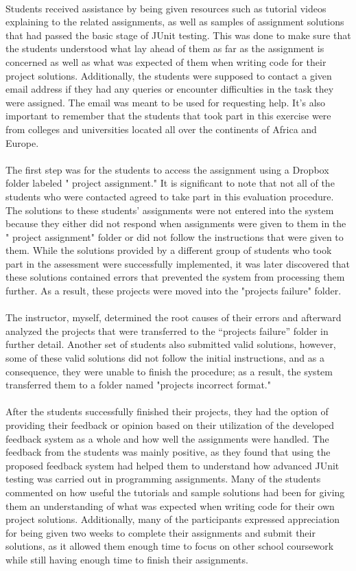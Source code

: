 \\ 
Students received assistance by being given resources such as tutorial videos explaining to the related assignments, as well as samples of assignment solutions that had passed the basic stage of JUnit testing. This was done to make sure that the students understood what lay ahead of them as far as the assignment is concerned as well as what was expected of them when writing code for their project solutions.  Additionally, the students were supposed to contact a given email address if they had any queries or encounter difficulties in the task they were assigned. The email was meant to be used for requesting help. It's also important to remember that the students that took part in this exercise were from colleges and universities located all over the continents of Africa and Europe.\\
\\
The first step was for the students to access the assignment using a Dropbox folder labeled " project assignment." It is significant to note that not all of the students who were contacted agreed to take part in this evaluation procedure. The solutions to these students' assignments were not entered into the system because they either did not respond when assignments were given to them in the " project assignment" folder or did not follow the instructions that were given to them. While the solutions provided by a different group of students who took part in the assessment were successfully implemented, it was later discovered that these solutions contained errors that prevented the system from processing them further. As a result, these projects were moved into the "projects failure" folder.\\
\\ 
The instructor, myself, determined the root causes of their errors and afterward analyzed the projects that were transferred to the “projects failure” folder in further detail. Another set of students also submitted valid solutions, however, some of these valid solutions did not follow the initial instructions, and as a consequence, they were unable to finish the procedure; as a result, the system transferred them to a folder named "projects incorrect format."\\
\\ 

After the students successfully finished their projects, they had the option of providing their feedback or opinion based on their utilization of the developed feedback system as a whole and how well the assignments were handled. The feedback from the students was mainly positive, as they found that using the proposed feedback system had helped them to understand how advanced JUnit testing was carried out in programming assignments. Many of the students commented on how useful the tutorials and sample solutions had been for giving them an understanding of what was expected when writing code for their own project solutions. Additionally, many of the participants expressed appreciation for being given two weeks to complete their assignments and submit their solutions, as it allowed them enough time to focus on other school coursework while still having enough time to finish their assignments. \\

